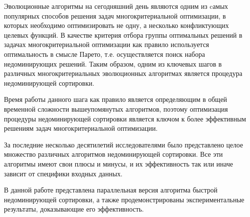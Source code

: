 \startprefacepage
Эволюционные алгоритмы на сегодняшний день являются одним из cамых популярных способов решения задач многокритериальной оптимизации, в которых необходимо оптимизировать не одну, а несколько конфликтующих целевых функций.
В качестве критерия отбора группы оптимальных решений в задачах многокритериальной оптимизации как правило используется оптимальность в смысле Парето, т.е. осуществляется поиск набора недоминирующих решений.
Таким образом, одним из ключевых шагов в различных многокритериальных эволюционных алгоритмах является процедура недоминирующей сортировки.

Время работы данного шага как правило является определяющим в общей временной сложности вышеупомянутых алгоритмов, поэтому оптимизация процедуры недоминирующей сортировки является ключом к более эффективным решениям задач многокритериальной оптимизации.

За последние несколько десятилетий исследователями было представлено целое множество различных алгоритмов недоминирующей сортировки.
Все эти алгоритмы имеют свои плюсы и минусы, и их эффективность так или иначе зависит от специфики входных данных.

В данной работе представлена параллельная версия алгоритма быстрой недоминирующей сортировки, а также продемонстрированы экспериментальные результаты, доказывающие его эффективность.
